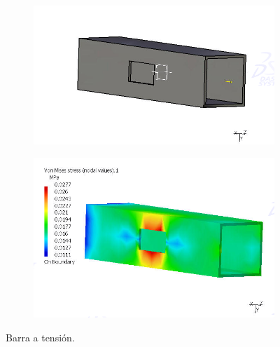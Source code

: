 \documentclass[12pt, letterpaper]{article}
\begin{document}
\begin{figure}[H]
	\centering
	\begin{subfigure}[b]{\linewidth}
		\includegraphics[width=\linewidth]{t1.png}
		\caption{}
	\end{subfigure}
	\begin{subfigure}[b]{\linewidth}
		\includegraphics[width=\linewidth]{t2.png}
		\caption{}
	\end{subfigure}
	\caption{Barra a tensión.}
\end{figure}
\end{document}
